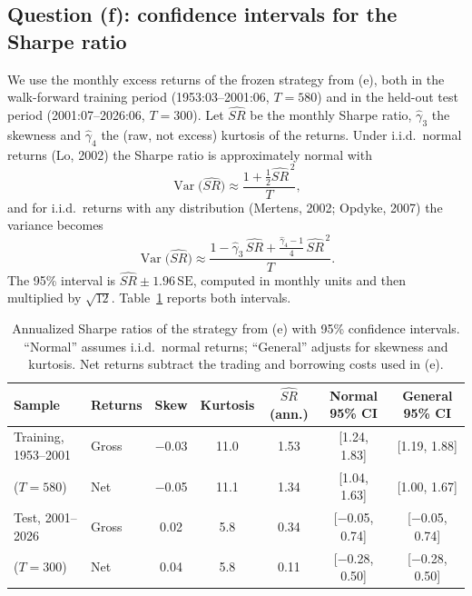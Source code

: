 
\subsection*{Question (f): confidence intervals for the Sharpe ratio}

We use the monthly excess returns of the frozen strategy from (e), both in the walk-forward
training period (1953:03--2001:06, $T=580$) and in the held-out test period (2001:07--2026:06,
$T=300$). Let $\widehat{SR}$ be the monthly Sharpe ratio, $\hat\gamma_3$ the skewness and
$\hat\gamma_4$ the (raw, not excess) kurtosis of the returns. Under i.i.d.\ normal returns
(Lo, 2002) the Sharpe ratio is approximately normal with
\[
  \operatorname{Var}\big(\widehat{SR}\big)\approx\frac{1+\tfrac12\widehat{SR}^{\,2}}{T},
\]
and for i.i.d.\ returns with any distribution (Mertens, 2002; Opdyke, 2007) the variance becomes
\[
  \operatorname{Var}\big(\widehat{SR}\big)\approx\frac{1-\hat\gamma_3\,\widehat{SR}
  +\tfrac{\hat\gamma_4-1}{4}\,\widehat{SR}^{\,2}}{T}.
\]
The 95\% interval is $\widehat{SR}\pm1.96\,\mathrm{SE}$, computed in monthly units and then
multiplied by $\sqrt{12}$. Table~\ref{tab:srci} reports both intervals.

\begin{table}[H]
\centering\small
\caption{Annualized Sharpe ratios of the strategy from (e) with 95\% confidence intervals. ``Normal'' assumes i.i.d.\ normal returns; ``General'' adjusts for skewness and kurtosis. Net returns subtract the trading and borrowing costs used in (e).}
\label{tab:srci}
\begin{tabular}{llccccc}
\toprule
Sample & Returns & Skew & Kurtosis & $\widehat{SR}$ (ann.) & Normal 95\% CI & General 95\% CI \\
\midrule
Training, 1953--2001 & Gross & $-$0.03 & 11.0 & 1.53 & [1.24, 1.83] & [1.19, 1.88] \\
($T=580$)            & Net   & $-$0.05 & 11.1 & 1.34 & [1.04, 1.63] & [1.00, 1.67] \\
\addlinespace
Test, 2001--2026     & Gross & 0.02 & 5.8 & 0.34 & [$-$0.05, 0.74] & [$-$0.05, 0.74] \\
($T=300$)            & Net   & 0.04 & 5.8 & 0.11 & [$-$0.28, 0.50] & [$-$0.28, 0.50] \\
\bottomrule
\end{tabular}
\end{table}

